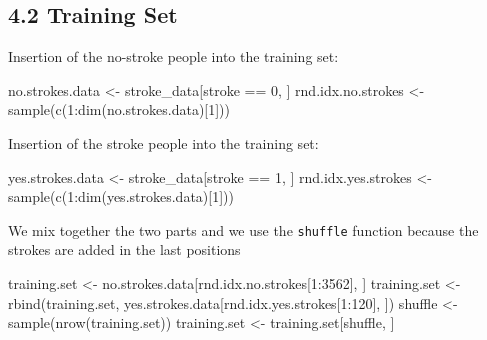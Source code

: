 \documentclass[
]{article}
\newenvironment{Shaded}{\begin{snugshade}}{\end{snugshade}}
\newcommand{\DecValTok}[1]{\textcolor[rgb]{0.00,0.00,0.81}{#1}}
\newcommand{\FunctionTok}[1]{\textcolor[rgb]{0.00,0.00,0.00}{#1}}
\newcommand{\NormalTok}[1]{#1}
\newcommand{\OtherTok}[1]{\textcolor[rgb]{0.56,0.35,0.01}{#1}}
\newcommand{\SpecialCharTok}[1]{\textcolor[rgb]{0.00,0.00,0.00}{#1}}
\begin{document}
\hypertarget{training-set}{%
\subsection{4.2 Training Set}\label{training-set}}

Insertion of the no-stroke people into the training set:

\begin{Shaded}
\begin{Highlighting}[]
\NormalTok{no.strokes.data }\OtherTok{\textless{}{-}}\NormalTok{ stroke\_data[stroke }\SpecialCharTok{==} \DecValTok{0}\NormalTok{, ]}
\NormalTok{rnd.idx.no.strokes }\OtherTok{\textless{}{-}} \FunctionTok{sample}\NormalTok{(}\FunctionTok{c}\NormalTok{(}\DecValTok{1}\SpecialCharTok{:}\FunctionTok{dim}\NormalTok{(no.strokes.data)[}\DecValTok{1}\NormalTok{]))}
\end{Highlighting}
\end{Shaded}

Insertion of the stroke people into the training set:

\begin{Shaded}
\begin{Highlighting}[]
\NormalTok{yes.strokes.data }\OtherTok{\textless{}{-}}\NormalTok{ stroke\_data[stroke }\SpecialCharTok{==} \DecValTok{1}\NormalTok{, ]}
\NormalTok{rnd.idx.yes.strokes }\OtherTok{\textless{}{-}} \FunctionTok{sample}\NormalTok{(}\FunctionTok{c}\NormalTok{(}\DecValTok{1}\SpecialCharTok{:}\FunctionTok{dim}\NormalTok{(yes.strokes.data)[}\DecValTok{1}\NormalTok{]))}
\end{Highlighting}
\end{Shaded}

We mix together the two parts and we use the \texttt{shuffle} function
because the strokes are added in the last positions

\begin{Shaded}
\begin{Highlighting}[]
\NormalTok{training.set }\OtherTok{\textless{}{-}}\NormalTok{ no.strokes.data[rnd.idx.no.strokes[}\DecValTok{1}\SpecialCharTok{:}\DecValTok{3562}\NormalTok{], ]}
\NormalTok{training.set }\OtherTok{\textless{}{-}} \FunctionTok{rbind}\NormalTok{(training.set, yes.strokes.data[rnd.idx.yes.strokes[}\DecValTok{1}\SpecialCharTok{:}\DecValTok{120}\NormalTok{], ])}
\NormalTok{shuffle }\OtherTok{\textless{}{-}} \FunctionTok{sample}\NormalTok{(}\FunctionTok{nrow}\NormalTok{(training.set))}
\NormalTok{training.set }\OtherTok{\textless{}{-}}\NormalTok{ training.set[shuffle, ]}
\end{Highlighting}
\end{Shaded}
\end{document}
